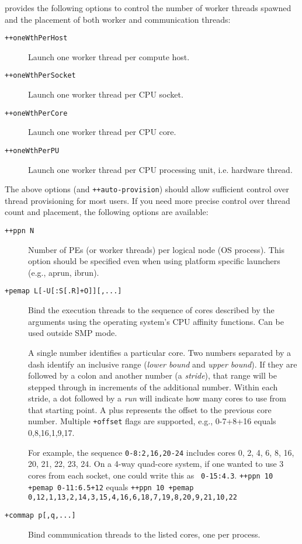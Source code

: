 \charmpp{} provides the following options to control
the number of worker threads spawned and the placement of both worker and
communication threads:

\begin{description}

\item[{\tt ++oneWthPerHost}] Launch one worker thread per compute host.

\item[{\tt ++oneWthPerSocket}] Launch one worker thread per CPU socket.

\item[{\tt ++oneWthPerCore}] Launch one worker thread per CPU core.

\item[{\tt ++oneWthPerPU}] Launch one worker thread per CPU processing unit,
i.e. hardware thread.

\end{description}

The above options (and {\tt ++auto-provision}) should allow sufficient control
over thread provisioning for most users. If you need more precise control over
thread count and placement, the following options are available:

\begin{description}

\item[{\tt ++ppn N}] Number of PEs (or worker threads) per logical node (OS process).
  This option should be specified even when using platform specific launchers
  (e.g., aprun, ibrun).

\item[{\tt +pemap L[-U[:S[.R]+O]][,...]}] Bind the execution threads to
  the sequence of cores described by the arguments using the operating
  system's CPU affinity functions. Can be used outside SMP mode.

A single number identifies a particular core. Two numbers separated by
a dash identify an inclusive range (\emph{lower bound} and \emph{upper
bound}). If they are followed by a colon and another number (a
\emph{stride}), that range will be stepped through in increments of
the additional number. Within each stride, a dot followed by a
\emph{run} will indicate how many cores to use from that starting
point. A plus represents the offset to the previous core number.
Multiple {\tt +offset} flags are supported, e.g., 0-7+8+16 equals 0,8,16,1,9,17.

For example, the sequence {\tt 0-8:2,16,20-24} includes cores 0, 2, 4,
6, 8, 16, 20, 21, 22, 23, 24. On a 4-way quad-core system, if one
wanted to use 3 cores from each socket, one could write this as {\tt
0-15:4.3}. {\tt ++ppn 10 +pemap 0-11:6.5+12} equals {\tt ++ppn 10 +pemap
0,12,1,13,2,14,3,15,4,16,6,18,7,19,8,20,9,21,10,22}

\item[{\tt +commap p[,q,...]}] Bind communication threads to the
  listed cores, one per process.

\end{description}

